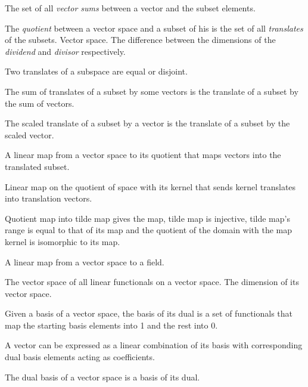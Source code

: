 \begin{multicols}{3}
  The set of all \textit{vector sums} between a vector and the subset elements.

  The \textit{quotient} between a vector space and a subset of his is the set of all
  \textit{translates} of the subsets.
   Vector space.
  The difference between the dimensions of the \textit{dividend} and \textit{divisor} respectively.

  Two translates of a subspace are equal or disjoint.

  The sum of translates of a subset by some vectors
  is the translate of a subset by the sum of vectors.
  
  The scaled translate of a subset by a vector
  is the translate of a subset by the scaled vector.

  A linear map from a vector space to its quotient that maps vectors
  into the translated subset.

  Linear map on the quotient of space with its kernel that
  sends kernel translates into translation vectors.

  Quotient map into tilde map gives the map, tilde map is injective,
  tilde map's range is equal to that of its map and
  the quotient of the domain with the map kernel is isomorphic
  to its map.


  A linear map from a vector space to a field.

  The vector space of all linear functionals on a vector space.
  The dimension of its vector space.

  Given a basis of a vector space, the basis of its dual
  is a set of functionals that map the starting basis elements
  into 1 and the rest into 0.

  A vector can be expressed as a linear combination of its
  basis with corresponding dual basis elements acting as
  coefficients.

  The dual basis of a vector space is a basis of its dual.


\end{multicols}

